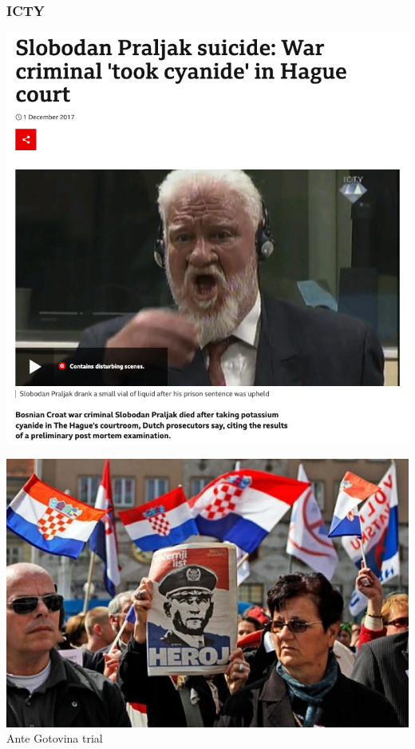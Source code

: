 \documentclass[aspectratio=43]{beamer}
\begin{document}

\begin{frame}
\frametitle{ICTY}
\centering

\begin{minipage}{.49\textwidth}\centering
\includegraphics[width = \textwidth]{img/praljak}
\end{minipage}\hfill
\begin{minipage}{.49\textwidth}\centering
\includegraphics[width = \textwidth]{img/gotovina}\\{\small Ante Gotovina trial}
\end{minipage}

\end{frame}
\end{document}
